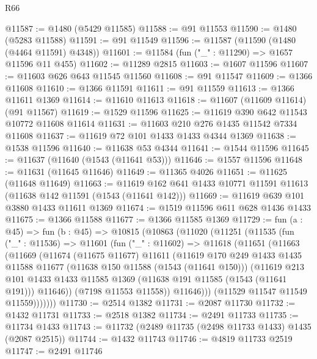 \begin{lexlean}{R66}
\begin{coremodule}
@11587 := @1480 (@5429 @11585)
@11588 := @91 @11553
@11590 := @1480 (@5283 @11588)
@11591 := @91 @11549
@11596 := @11587 (@11590 (@1480 (@4464 @11591) @4348))
@11601 := @11584 (fun ("_" : @11290) => @1657 @11596 @11 @455)
@11602 := @11289 @2815
@11603 := @1607 @11596
@11607 := @11603 @626 @643 @11545 @11560
@11608 := @91 @11547
@11609 := @1366 @11608
@11610 := @1366 @11591
@11611 := @91 @11559
@11613 := @1366 @11611 @1369
@11614 := @11610 @11613
@11618 := @11607 (@11609 @11614) (@91 @11567)
@11619 := @1529 @11596
@11625 := @11619 @390 @642 @11543 @10772 @11608 @11614
@11631 := @11603 @210 @276 @1435 @11542 @7334 @11608
@11637 := @11619 @72 @101 @1433 @1433 @4344 @1369
@11638 := @1538 @11596
@11640 := @11638 @53 @4344
@11641 := @1544 @11596
@11645 := @11637 (@11640 (@1543 (@11641 @53)))
@11646 := @1557 @11596
@11648 := @11631 (@11645 @11646)
@11649 := @11365 @4026
@11651 := @11625 (@11648 @11649)
@11663 := @11619 @162 @641 @1433 @10771 @11591 @11613 (@11638 @142 @11591 (@1543 (@11641 @142)))
@11669 := @11619 @639 @101 @3880 @1433 @11611 @1369
@11674 := @1519 @11596 @611 @628 @1436 @1433
@11675 := @1366 @11588
@11677 := @1366 @11585 @1369
@11729 := fun (a : @45) =>
  fun (b : @45) =>
  @10815
    (@10863
      (@11020
        (@11251
          (@11535
            (fun ("_" : @11536) =>
            @11601
              (fun ("_" : @11602) =>
              @11618
                (@11651
                  (@11663
                    (@11669
                      (@11674
                        (@11675 @11677)
                        @11611
                        (@11619
                          @170
                          @249
                          @1433
                          @1435
                          @11588
                          @11677
                          (@11638 @150 @11588 (@1543 (@11641 @150)))
                          (@11619
                            @213
                            @101
                            @1433
                            @1433
                            @11585
                            @1369
                            (@11638 @191 @11585 (@1543 (@11641 @191)))
                            @11646))
                        (@7198 @11553 @11558))
                      @11646)))
                (@11529 @11547 @11549 @11559)))))))
@11730 := @2514 @1382
@11731 := @2087 @11730
@11732 := @1432 @11731
@11733 := @2518 @1382
@11734 := @2491 @11733
@11735 := @11734 @1433
@11743 := @11732 (@2489 @11735 (@2498 @11733 @1433) @1435 (@2087 @2515))
@11744 := @1432 @11743
@11746 := @4819 @11733 @2519
@11747 := @2491 @11746

\end{coremodule}
\end{lexlean}
